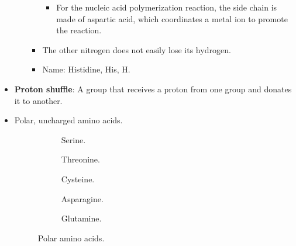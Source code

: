 \documentclass[../notes.tex]{subfiles}
\begin{document}
\begin{itemize}
\begin{itemize}
\begin{itemize}
\begin{itemize}
                \item For the nucleic acid polymerization reaction, the side chain is made of aspartic acid, which coordinates a metal ion to promote the reaction.
            \end{itemize}
            \item The other nitrogen does not easily lose its hydrogen.
            \item Name: Histidine, His, H.
        \end{itemize}
    \end{itemize}
    \item \textbf{Proton shuffle}: A group that receives a proton from one group and donates it to another.
    \item Polar, uncharged amino acids.
    \begin{figure}[h!]
        \centering
        \footnotesize
        \begin{subfigure}[b]{0.19\linewidth}
            \centering
            \caption{Serine.}
            \label{fig:AApolarS}
        \end{subfigure}
        \begin{subfigure}[b]{0.19\linewidth}
            \centering
            \caption{Threonine.}
            \label{fig:AApolarT}
        \end{subfigure}
        \begin{subfigure}[b]{0.19\linewidth}
            \centering
            \caption{Cysteine.}
            \label{fig:AApolarC}
        \end{subfigure}
        \begin{subfigure}[b]{0.19\linewidth}
            \centering
            \caption{Asparagine.}
            \label{fig:AApolarN}
        \end{subfigure}
        \begin{subfigure}[b]{0.19\linewidth}
            \centering
            \caption{Glutamine.}
            \label{fig:AApolarQ}
        \end{subfigure}
        \caption{Polar amino acids.}
        \label{fig:AApolar}
    \end{figure}
    \begin{itemize}

\end{itemize}
\end{itemize}
\end{document}
